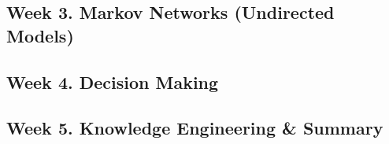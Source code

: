 \documentclass[12pt]{article}
\begin{document}
\subsection{Week 3. Markov Networks (Undirected Models)}


\subsection{Week 4. Decision Making}


\subsection{Week 5. Knowledge Engineering \& Summary}
\end{document}
